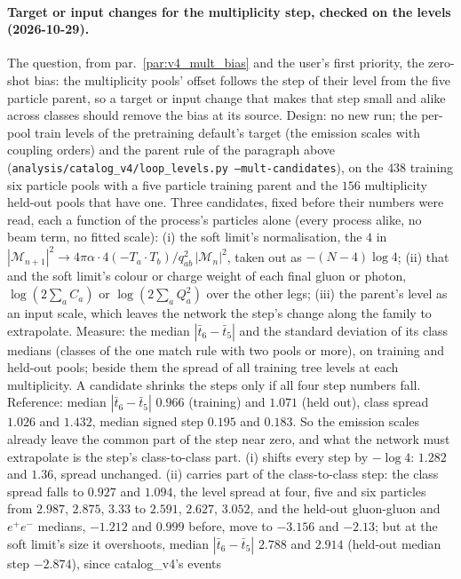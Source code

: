 \documentclass[11pt]{article}
\newcommand{\code}[1]{\texttt{#1}}
\begin{document}
\paragraph{Target or input changes for the multiplicity step, checked on the levels (2026-10-29).}\label{par:v4_mult_cand}
The question, from par.~\ref{par:v4_mult_bias} and the user's first priority, the zero-shot bias: the multiplicity
pools' offset follows the step of their level from the five particle parent, so a target or input change that makes
that step small and alike across classes should remove the bias at its source. Design: no new run; the per-pool train
levels of the pretraining default's target (the emission scales with coupling orders) and the parent rule of the
paragraph above (\code{analysis/catalog\_v4/loop\_levels.py --mult-candidates}), on the $438$ training six particle
pools with a five particle training parent and the $156$ multiplicity held-out pools that have one. Three candidates,
fixed before their numbers were read, each a function of the process's particles alone (every process alike, no beam
term, no fitted scale): (i) the soft limit's normalisation, the $4$ in $|\mathcal M_{n+1}|^2\to4\pi\alpha\cdot
4(-T_a\cdot T_b)/q^2_{ab}\,|\mathcal M_n|^2$, taken out as $-(N-4)\log4$; (ii) that and the soft limit's colour or charge
weight of each final gluon or photon, $\log(2\sum_a C_a)$ or $\log(2\sum_a Q_a^2)$ over the other legs; (iii) the parent's
level as an input scale, which leaves the network the step's change along the family to extrapolate. Measure: the
median $|\bar t_6-\bar t_5|$ and the standard deviation of its class medians (classes of the one match rule with two
pools or more), on training and held-out pools; beside them the spread of all training tree levels at each
multiplicity. A candidate shrinks the steps only if all four step numbers fall. Reference: median $|\bar t_6-\bar
t_5|$ $0.966$ (training) and $1.071$ (held out), class spread $1.026$ and $1.432$, median signed step $0.195$ and
$0.183$. So the emission scales already leave the common part of the step near zero, and what the network must
extrapolate is the step's class-to-class part. (i) shifts every step by $-\log4$: $1.282$ and $1.36$, spread unchanged.
(ii) carries part of the class-to-class step: the class spread falls to $0.927$ and $1.094$, the level spread at four,
five and six particles from $2.987$, $2.875$, $3.33$ to $2.591$, $2.627$, $3.052$, and the held-out gluon-gluon and
$e^+e^-$ medians, $-1.212$ and $0.999$ before, move to $-3.156$ and $-2.13$; but at the soft limit's size it
overshoots, median $|\bar t_6-\bar t_5|$ $2.788$ and $2.914$ (held-out median step $-2.874$), since catalog\_v4's events
\end{document}
